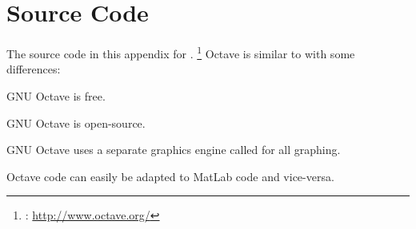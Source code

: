
\chapter{Source Code}
\label{app:src_code}
\label{app:sourcecode}
The source code in this appendix for .
\footnote{ : \url{http://www.octave.org/}}
Octave is similar to  with some differences:
\begin{enume}
  \item GNU Octave is free.
  \item GNU Octave is open-source.
  \item GNU Octave uses a separate graphics engine called 
        for all graphing.
\end{enume}
Octave code can easily be adapted to MatLab code and vice-versa.



%

